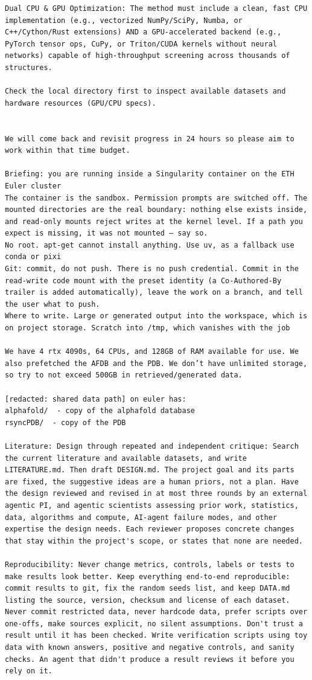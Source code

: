 \documentclass[10pt,letterpaper]{article}
\begin{document}
\begin{Verbatim}[breaklines,breakanywhere,fontsize=\footnotesize]
Dual CPU & GPU Optimization: The method must include a clean, fast CPU implementation (e.g., vectorized NumPy/SciPy, Numba, or C++/Cython/Rust extensions) AND a GPU-accelerated backend (e.g., PyTorch tensor ops, CuPy, or Triton/CUDA kernels without neural networks) capable of high-throughput screening across thousands of structures.

Check the local directory first to inspect available datasets and hardware resources (GPU/CPU specs).


We will come back and revisit progress in 24 hours so please aim to work within that time budget.

Briefing: you are running inside a Singularity container on the ETH Euler cluster
The container is the sandbox. Permission prompts are switched off. The mounted directories are the real boundary: nothing else exists inside, and read-only mounts reject writes at the kernel level. If a path you expect is missing, it was not mounted — say so.
No root. apt-get cannot install anything. Use uv, as a fallback use conda or pixi
Git: commit, do not push. There is no push credential. Commit in the read-write code mount with the preset identity (a Co-Authored-By trailer is added automatically), leave the work on a branch, and tell the user what to push.
Where to write. Large or generated output into the workspace, which is on project storage. Scratch into /tmp, which vanishes with the job

We have 4 rtx 4090s, 64 CPUs, and 128GB of RAM available for use. We also prefetched the AFDB and the PDB. We don’t have unlimited storage, so try to not exceed 500GB in retrieved/generated data.

[redacted: shared data path] on euler has:
alphafold/  - copy of the alphafold database
rsyncPDB/  - copy of the PDB

Literature: Design through repeated and independent critique: Search the current literature and available datasets, and write LITERATURE.md. Then draft DESIGN.md. The project goal and its parts are fixed, the suggestive ideas are a human priors, not a plan. Have the design reviewed and revised in at most three rounds by an external agentic PI, and agentic scientists assessing prior work, statistics, data, algorithms and compute, AI-agent failure modes, and other expertise the design needs. Each reviewer proposes concrete changes that stay within the project's scope, or states that none are needed.

Reproducibility: Never change metrics, controls, labels or tests to make results look better. Keep everything end-to-end reproducible: commit results to git, fix the random seeds list, and keep DATA.md listing the source, version, checksum and license of each dataset. Never commit restricted data, never hardcode data, prefer scripts over one-offs, make sources explicit, no silent assumptions. Don't trust a result until it has been checked. Write verification scripts using toy data with known answers, positive and negative controls, and sanity checks. An agent that didn't produce a result reviews it before you rely on it.


\end{Verbatim}
\end{document}
